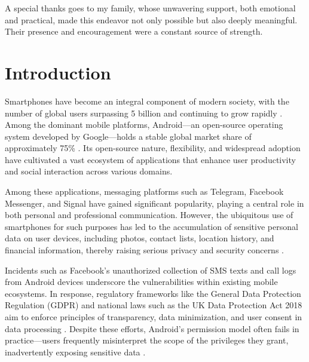 \documentclass[a4paper,12pt]{report}
\begin{document}
A special thanks goes to my family, whose unwavering support, both emotional and practical,
made this endeavor not only possible but also deeply meaningful. Their presence and
encouragement were a constant source of strength.

\clearpage

\tableofcontents
\clearpage

\chapter{Introduction}

Smartphones have become an integral component of modern society, with the number
of global users surpassing 5 billion and continuing to grow rapidly
\cite{DataReportal2025}. Among the dominant mobile platforms, Android—an
open-source operating system developed by Google—holds a stable global market
share of approximately 75\% \cite{StatCounter2025}. Its open-source nature,
flexibility, and widespread adoption have cultivated a vast ecosystem of
applications that enhance user productivity and social interaction across
various domains.

Among these applications, messaging platforms such as Telegram,
Facebook Messenger, and Signal have gained significant popularity, playing a
central role in both personal and professional communication. However, the
ubiquitous use of smartphones for such purposes has led to the accumulation of
sensitive personal data on user devices, including photos, contact lists,
location history, and financial information, thereby raising serious privacy and
security concerns \cite{ArsTechnica2018}.

Incidents such as Facebook’s unauthorized collection of SMS texts and call logs
from Android devices \cite{ArsTechnica2018} underscore the vulnerabilities
within existing mobile ecosystems. In response, regulatory frameworks like the
General Data Protection Regulation (GDPR) and national laws such as the UK Data
Protection Act 2018 aim to enforce principles of transparency, data
minimization, and user consent in data processing
\cite{GDPR2016,UKDPA2018}. Despite these efforts, Android’s permission model
often fails in practice—users frequently misinterpret the scope of the
privileges they grant, inadvertently exposing sensitive data \cite{CHI2024Permissions}.
\end{document}
